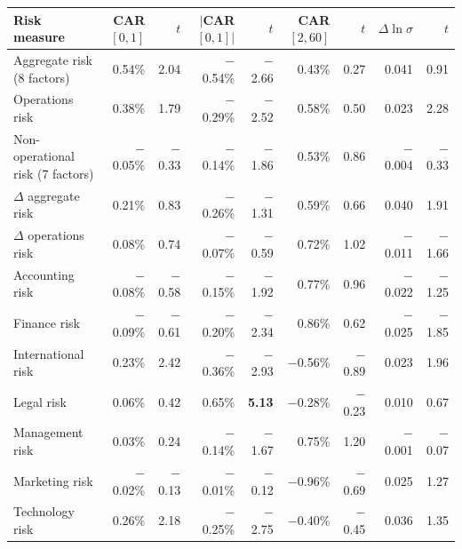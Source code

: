 \begin{tabular}{lrrrrrrrr}
\toprule
Risk measure & CAR$[0,1]$ & $t$ & $|$CAR$[0,1]|$ & $t$ & CAR$[2,60]$ & $t$ & $\Delta\ln\sigma$ & $t$ \\
\midrule
Aggregate risk (8 factors) & 0.54\% & 2.04 & \ensuremath{-}0.54\% & \ensuremath{-}2.66 & 0.43\% & 0.27 & 0.041 & 0.91 \\
Operations risk & 0.38\% & 1.79 & \ensuremath{-}0.29\% & \ensuremath{-}2.52 & 0.58\% & 0.50 & 0.023 & 2.28 \\
Non-operational risk (7 factors) & \ensuremath{-}0.05\% & \ensuremath{-}0.33 & \ensuremath{-}0.14\% & \ensuremath{-}1.86 & 0.53\% & 0.86 & \ensuremath{-}0.004 & \ensuremath{-}0.33 \\
$\Delta$ aggregate risk & 0.21\% & 0.83 & \ensuremath{-}0.26\% & \ensuremath{-}1.31 & 0.59\% & 0.66 & 0.040 & 1.91 \\
$\Delta$ operations risk & 0.08\% & 0.74 & \ensuremath{-}0.07\% & \ensuremath{-}0.59 & 0.72\% & 1.02 & \ensuremath{-}0.011 & \ensuremath{-}1.66 \\
Accounting risk & \ensuremath{-}0.08\% & \ensuremath{-}0.58 & \ensuremath{-}0.15\% & \ensuremath{-}1.92 & 0.77\% & 0.96 & \ensuremath{-}0.022 & \ensuremath{-}1.25 \\
Finance risk & \ensuremath{-}0.09\% & \ensuremath{-}0.61 & \ensuremath{-}0.20\% & \ensuremath{-}2.34 & 0.86\% & 0.62 & \ensuremath{-}0.025 & \ensuremath{-}1.85 \\
International risk & 0.23\% & 2.42 & \ensuremath{-}0.36\% & \ensuremath{-}2.93 & \ensuremath{-}0.56\% & \ensuremath{-}0.89 & 0.023 & 1.96 \\
Legal risk & 0.06\% & 0.42 & 0.65\% & \textbf{5.13} & \ensuremath{-}0.28\% & \ensuremath{-}0.23 & 0.010 & 0.67 \\
Management risk & 0.03\% & 0.24 & \ensuremath{-}0.14\% & \ensuremath{-}1.67 & 0.75\% & 1.20 & \ensuremath{-}0.001 & \ensuremath{-}0.07 \\
Marketing risk & \ensuremath{-}0.02\% & \ensuremath{-}0.13 & \ensuremath{-}0.01\% & \ensuremath{-}0.12 & \ensuremath{-}0.96\% & \ensuremath{-}0.69 & 0.025 & 1.27 \\
Technology risk & 0.26\% & 2.18 & \ensuremath{-}0.25\% & \ensuremath{-}2.75 & \ensuremath{-}0.40\% & \ensuremath{-}0.45 & 0.036 & 1.35 \\
\bottomrule
\end{tabular}
